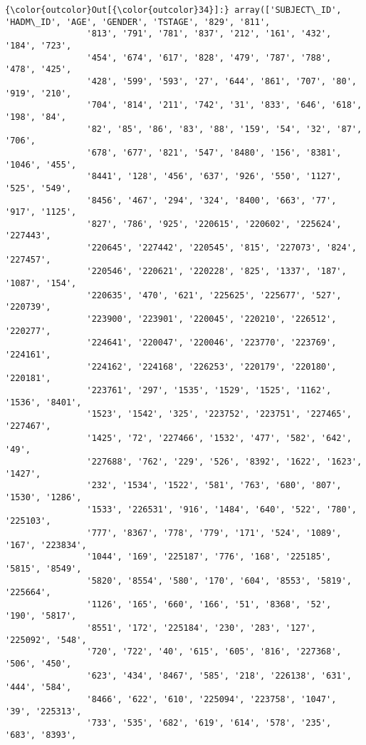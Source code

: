 \documentclass[11pt]{article}
\begin{document}
\begin{Verbatim}[commandchars=\\\{\}]
{\color{outcolor}Out[{\color{outcolor}34}]:} array(['SUBJECT\_ID', 'HADM\_ID', 'AGE', 'GENDER', 'TSTAGE', '829', '811',
                '813', '791', '781', '837', '212', '161', '432', '184', '723',
                '454', '674', '617', '828', '479', '787', '788', '478', '425',
                '428', '599', '593', '27', '644', '861', '707', '80', '919', '210',
                '704', '814', '211', '742', '31', '833', '646', '618', '198', '84',
                '82', '85', '86', '83', '88', '159', '54', '32', '87', '706',
                '678', '677', '821', '547', '8480', '156', '8381', '1046', '455',
                '8441', '128', '456', '637', '926', '550', '1127', '525', '549',
                '8456', '467', '294', '324', '8400', '663', '77', '917', '1125',
                '827', '786', '925', '220615', '220602', '225624', '227443',
                '220645', '227442', '220545', '815', '227073', '824', '227457',
                '220546', '220621', '220228', '825', '1337', '187', '1087', '154',
                '220635', '470', '621', '225625', '225677', '527', '220739',
                '223900', '223901', '220045', '220210', '226512', '220277',
                '224641', '220047', '220046', '223770', '223769', '224161',
                '224162', '224168', '226253', '220179', '220180', '220181',
                '223761', '297', '1535', '1529', '1525', '1162', '1536', '8401',
                '1523', '1542', '325', '223752', '223751', '227465', '227467',
                '1425', '72', '227466', '1532', '477', '582', '642', '49',
                '227688', '762', '229', '526', '8392', '1622', '1623', '1427',
                '232', '1534', '1522', '581', '763', '680', '807', '1530', '1286',
                '1533', '226531', '916', '1484', '640', '522', '780', '225103',
                '777', '8367', '778', '779', '171', '524', '1089', '167', '223834',
                '1044', '169', '225187', '776', '168', '225185', '5815', '8549',
                '5820', '8554', '580', '170', '604', '8553', '5819', '225664',
                '1126', '165', '660', '166', '51', '8368', '52', '190', '5817',
                '8551', '172', '225184', '230', '283', '127', '225092', '548',
                '720', '722', '40', '615', '605', '816', '227368', '506', '450',
                '623', '434', '8467', '585', '218', '226138', '631', '444', '584',
                '8466', '622', '610', '225094', '223758', '1047', '39', '225313',
                '733', '535', '682', '619', '614', '578', '235', '683', '8393',

\end{Verbatim}
\end{document}
